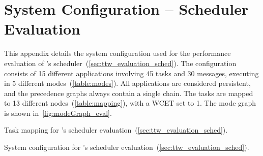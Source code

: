 
\section{System Configuration -- Scheduler Evaluation}
\label{append:inheritance_eval}

This appendix details the system configuration used for the performance evaluation of \TTW's scheduler~(\cref{sec:ttw_evaluation_sched}).
The configuration consists of 15 different applications involving 45 tasks and 30 messages, executing in 5 different modes~(\cref{table:modes}).
All applications are considered persistent, and the precedence graphs always contain a single chain.
The tasks are mapped to 13 different nodes~(\cref{table:mapping}), with a WCET set to 1\ms.
The mode graph is shown in~\cref{fig:modeGraph_eval}.


\begin{table}[b]
  \centering
  \caption{Task mapping for \TTW's scheduler evaluation~(\cref{sec:ttw_evaluation_sched}).}
  \label{table:mapping}
  {\smaller }
\end{table}

\begin{table}[b]
  \centering
  \caption{System configuration for \TTW's scheduler evaluation~(\cref{sec:ttw_evaluation_sched}).}
  \label{table:modes}
  {\smaller }
\end{table}
